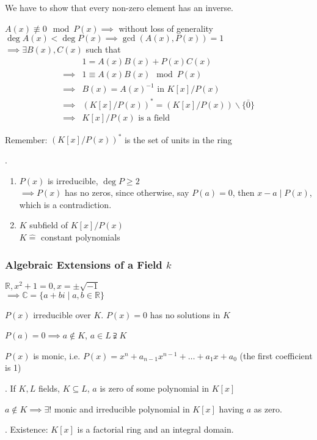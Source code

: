 We have to show that every non-zero element has an inverse.

$A(x) \not\equiv 0 \mod P(x) \implies $ without loss of generality $\deg A(x) < \deg P(x) \implies \gcd(A(x), P(x)) = 1$\\
$\implies \exists B(x), C(x)$ such that
\begin{align*}
  & 1 = A(x)B(x) + P(x)C(x)\\
  \implies & 1 \equiv A(x) B(x) \mod P(x) \\
  \implies & B(x) = A(x)^{-1} \text{ in } K[x] / P(x) \\
  \implies & (K[x] / P(x))^{*} = (K[x]/P(x)) \backslash \{\bar{0}\} \\
  \implies & K[x] / P(x) \text{ is a field}
\end{align*}

Remember: $(K[x] / P(x))^{*}$ is the set of units in the ring

\Remark.
\begin{enumerate}[1)]
  \item $P(x)$ is irreducible, $\deg P \geq 2$\\
  $\implies P(x)$ has no zeros, since otherwise, say $P(a) = 0$, then $x - a ∣ P(x)$, which is a contradiction.

  \item $K$ subfield of $K[x]/P(x)$\\
  $K\hat{=}$ constant polynomials
\end{enumerate}

\subsubsection{Algebraic Extensions of a Field $k$}
$\mathbb{R}, x^2 +1 = 0, x = \pm \sqrt{-1}$ \\
$\implies \mathbb{C} = \{a+bi \mid a,b \in \mathbb{R} \}$

$P(x)$ irreducible over $K$. $P(x) = 0$ has no solutions in $K$

$P(a) = 0 \implies a\notin K$, $ a \in L \supsetneqq K$

$P(x)$ is monic, i.e. $P(x) = x^n + a_{n-1}x^{n-1} + \ldots + a_1 x + a_0$ (the first coefficient is 1)

\Theorem.
If $K,L$ fields, $K\subseteq L$, $a$ is zero of some polynomial in $K[x]$

$a \notin K \implies \exists!$ monic and irreducible polynomial in $K[x]$ having $a$ as zero.

\Proof.
Existence: $K[x]$ is a factorial ring and an integral domain.

